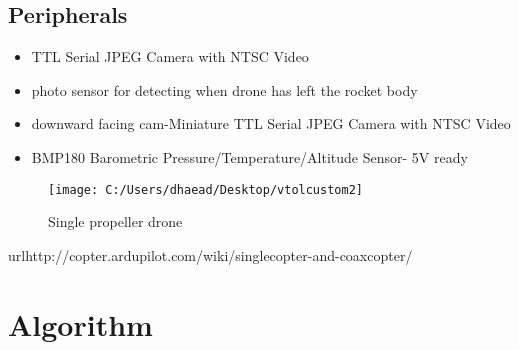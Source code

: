 \documentclass[10pt,a4paper]{article}
\begin{document}
\subsection{Peripherals}
\begin{itemize}

\item TTL Serial JPEG Camera with NTSC Video

\item photo sensor for detecting when drone has left the rocket body
\item downward facing cam-Miniature TTL Serial JPEG Camera with NTSC Video


\item BMP180 Barometric Pressure/Temperature/Altitude Sensor- 5V ready
\end{itemize}

\begin{figure}[H]
\centering
\texttt{[image: C:/Users/dhaead/Desktop/vtolcustom2]}
\caption{Single propeller drone}
\label{fig:vtolcustom2}
\end{figure}
url{http://copter.ardupilot.com/wiki/singlecopter-and-coaxcopter/}



\pagebreak
\section{Algorithm}
\end{document}
